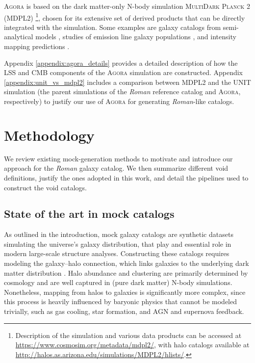 \documentclass[]{aa} %
\begin{document}
\textsc{Agora} is based on the dark matter-only N-body simulation \textsc{MultiDark Planck 2} (MDPL2) \citep{klypin2016}\footnote{Description of the simulation and various data products can be accessed at \url{https://www.cosmosim.org/metadata/mdpl2/}, with halo catalogs available at \url{http://halos.as.arizona.edu/simulations/MDPL2/hlists/}.}, chosen for its extensive set of derived products that can be directly integrated with the simulation. Some examples are galaxy catalogs from semi-analytical models \citep{cora2018}, studies of emission line galaxy populations \citep{alam2021}, and intensity mapping predictions \citep{sato2023}. 

Appendix \ref{appendix:agora_details} provides a detailed description of how the LSS and CMB components of the \textsc{Agora} simulation are constructed. Appendix \ref{appendix:unit_vs_mdpl2} includes a comparison between \textsc{MDPL2} and the UNIT simulation (the parent simulations of the \emph{Roman} reference catalog and \textsc{Agora}, respectively) to justify our use of \textsc{Agora} for generating \emph{Roman}-like catalogs.


\section{Methodology}
\label{sec:methodology}


We review existing mock-generation methods to motivate and introduce our approach for the \emph{Roman} galaxy catalog. We then summarize different void definitions, justify the ones adopted in this work, and detail the pipelines used to construct the void catalogs.

\subsection{State of the art in mock catalogs}
As outlined in the introduction, mock galaxy catalogs are synthetic datasets simulating the universe's galaxy distribution, that play and essential role in modern large-scale structure analyses. Constructing these catalogs requires modeling the galaxy–halo connection, which links galaxies to the underlying dark matter distribution \citep{kaiser1984spatial,bardeen1986statistics,mo1996analytic,fry1996evolution,tegmark1998time}. Halo abundance and clustering are primarily determined by cosmology and are well captured in (pure dark matter) N-body simulations. Nonetheless, mapping from halos to galaxies is significantly more complex, since this process is heavily influenced by baryonic physics that cannot be modeled trivially, such as gas cooling, star formation, and AGN and supernova feedback.
\end{document}
